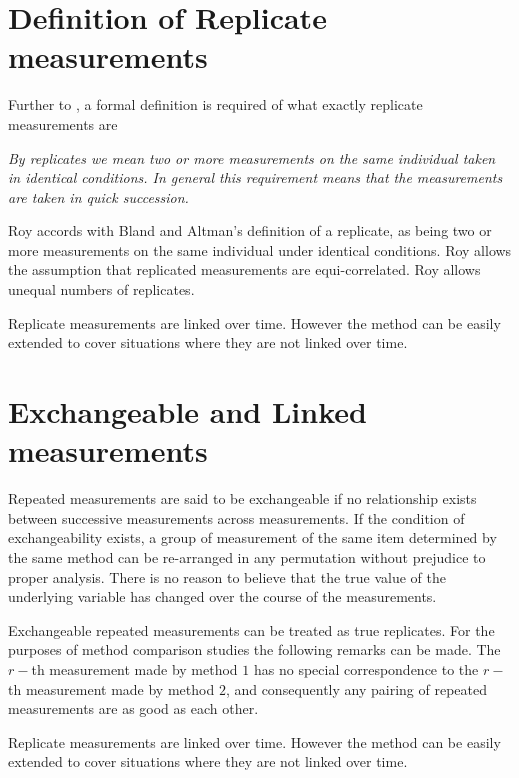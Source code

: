 \documentclass[12pt, a4paper]{report}
\theoremstyle{plain}
\theoremstyle{definition}
\theoremstyle{remark}
\begin{document}
	\section{Definition of Replicate measurements}
	Further to \citet{BA99}, a formal definition is required of what exactly replicate measurements are
	
	\emph{By replicates we mean two or more measurements on the same
		individual taken in identical conditions. In general this requirement means that the
		measurements are taken in quick succession.}
	
	Roy accords with Bland and Altman's definition of a replicate, as being two or more measurements on the same individual under identical conditions. Roy allows the assumption that replicated measurements are equi-correlated. Roy allows unequal numbers of replicates.
	
	Replicate measurements are linked over time. However the method can be easily extended to cover situations where they are not linked over time.

	\section{Exchangeable and Linked measurements}
	
	
	Repeated measurements are said to be exchangeable if no relationship exists between successive measurements across measurements. If the condition of exchangeability exists, a group of measurement of the same item determined by the same method can be re-arranged in any permutation without prejudice to proper analysis. There is no reason to believe that the true value of the underlying variable has changed over the course of the measurements.
	
	Exchangeable repeated measurements can be treated as true replicates. For the purposes of method comparison studies the following remarks can be made. The $r-$th measurement made by method $1$ has no special correspondence to the $r-$th measurement made by method $2$, and consequently any pairing of repeated measurements are as good as each other.
	
	
	
	
	Replicate measurements are linked over time. However the method can be easily extended to cover situations where they are not linked over time.
	
	
	
\end{document}
